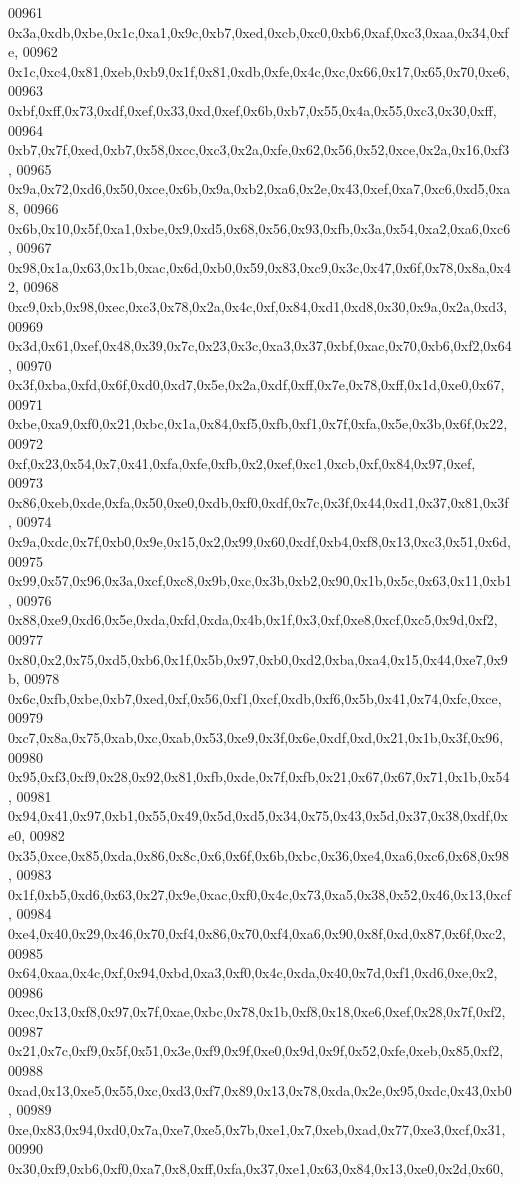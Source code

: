 \begin{DoxyCode}
00961   0x3a,0xdb,0xbe,0x1c,0xa1,0x9c,0xb7,0xed,0xcb,0xc0,0xb6,0xaf,0xc3,0xaa,0x34,0xfe,
00962   0x1c,0xc4,0x81,0xeb,0xb9,0x1f,0x81,0xdb,0xfe,0x4c,0xc,0x66,0x17,0x65,0x70,0xe6,
00963   0xbf,0xff,0x73,0xdf,0xef,0x33,0xd,0xef,0x6b,0xb7,0x55,0x4a,0x55,0xc3,0x30,0xff,
00964   0xb7,0x7f,0xed,0xb7,0x58,0xcc,0xc3,0x2a,0xfe,0x62,0x56,0x52,0xce,0x2a,0x16,0xf3,
00965   0x9a,0x72,0xd6,0x50,0xce,0x6b,0x9a,0xb2,0xa6,0x2e,0x43,0xef,0xa7,0xc6,0xd5,0xa8,
00966   0x6b,0x10,0x5f,0xa1,0xbe,0x9,0xd5,0x68,0x56,0x93,0xfb,0x3a,0x54,0xa2,0xa6,0xc6,
00967   0x98,0x1a,0x63,0x1b,0xac,0x6d,0xb0,0x59,0x83,0xc9,0x3c,0x47,0x6f,0x78,0x8a,0x42,
00968   0xc9,0xb,0x98,0xec,0xc3,0x78,0x2a,0x4c,0xf,0x84,0xd1,0xd8,0x30,0x9a,0x2a,0xd3,
00969   0x3d,0x61,0xef,0x48,0x39,0x7c,0x23,0x3c,0xa3,0x37,0xbf,0xac,0x70,0xb6,0xf2,0x64,
00970   0x3f,0xba,0xfd,0x6f,0xd0,0xd7,0x5e,0x2a,0xdf,0xff,0x7e,0x78,0xff,0x1d,0xe0,0x67,
00971   0xbe,0xa9,0xf0,0x21,0xbc,0x1a,0x84,0xf5,0xfb,0xf1,0x7f,0xfa,0x5e,0x3b,0x6f,0x22,
00972   0xf,0x23,0x54,0x7,0x41,0xfa,0xfe,0xfb,0x2,0xef,0xc1,0xcb,0xf,0x84,0x97,0xef,
00973   0x86,0xeb,0xde,0xfa,0x50,0xe0,0xdb,0xf0,0xdf,0x7c,0x3f,0x44,0xd1,0x37,0x81,0x3f,
00974   0x9a,0xdc,0x7f,0xb0,0x9e,0x15,0x2,0x99,0x60,0xdf,0xb4,0xf8,0x13,0xc3,0x51,0x6d,
00975   0x99,0x57,0x96,0x3a,0xcf,0xc8,0x9b,0xc,0x3b,0xb2,0x90,0x1b,0x5c,0x63,0x11,0xb1,
00976   0x88,0xe9,0xd6,0x5e,0xda,0xfd,0xda,0x4b,0x1f,0x3,0xf,0xe8,0xcf,0xc5,0x9d,0xf2,
00977   0x80,0x2,0x75,0xd5,0xb6,0x1f,0x5b,0x97,0xb0,0xd2,0xba,0xa4,0x15,0x44,0xe7,0x9b,
00978   0x6c,0xfb,0xbe,0xb7,0xed,0xf,0x56,0xf1,0xcf,0xdb,0xf6,0x5b,0x41,0x74,0xfc,0xce,
00979   0xc7,0x8a,0x75,0xab,0xc,0xab,0x53,0xe9,0x3f,0x6e,0xdf,0xd,0x21,0x1b,0x3f,0x96,
00980   0x95,0xf3,0xf9,0x28,0x92,0x81,0xfb,0xde,0x7f,0xfb,0x21,0x67,0x67,0x71,0x1b,0x54,
00981   0x94,0x41,0x97,0xb1,0x55,0x49,0x5d,0xd5,0x34,0x75,0x43,0x5d,0x37,0x38,0xdf,0xe0,
00982   0x35,0xce,0x85,0xda,0x86,0x8c,0x6,0x6f,0x6b,0xbc,0x36,0xe4,0xa6,0xc6,0x68,0x98,
00983   0x1f,0xb5,0xd6,0x63,0x27,0x9e,0xac,0xf0,0x4c,0x73,0xa5,0x38,0x52,0x46,0x13,0xcf,
00984   0xe4,0x40,0x29,0x46,0x70,0xf4,0x86,0x70,0xf4,0xa6,0x90,0x8f,0xd,0x87,0x6f,0xc2,
00985   0x64,0xaa,0x4c,0xf,0x94,0xbd,0xa3,0xf0,0x4c,0xda,0x40,0x7d,0xf1,0xd6,0xe,0x2,
00986   0xec,0x13,0xf8,0x97,0x7f,0xae,0xbc,0x78,0x1b,0xf8,0x18,0xe6,0xef,0x28,0x7f,0xf2,
00987   0x21,0x7c,0xf9,0x5f,0x51,0x3e,0xf9,0x9f,0xe0,0x9d,0x9f,0x52,0xfe,0xeb,0x85,0xf2,
00988   0xad,0x13,0xe5,0x55,0xc,0xd3,0xf7,0x89,0x13,0x78,0xda,0x2e,0x95,0xdc,0x43,0xb0,
00989   0xe,0x83,0x94,0xd0,0x7a,0xe7,0xe5,0x7b,0xe1,0x7,0xeb,0xad,0x77,0xe3,0xcf,0x31,
00990   0x30,0xf9,0xb6,0xf0,0xa7,0x8,0xff,0xfa,0x37,0xe1,0x63,0x84,0x13,0xe0,0x2d,0x60,

\end{DoxyCode}
